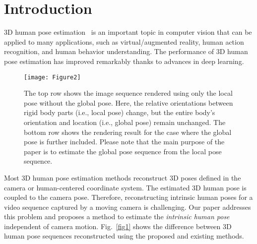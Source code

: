 \documentclass[10pt,twocolumn,letterpaper]{article}
\begin{document}
\section{Introduction}

3D human pose estimation~\cite{huang2017towards,pavlakos2017coarse,martinez2017simple,pavllo20193d,kanazawa2018end,kolotouros2019learning,kocabas2019self,guler2019holopose,kolotouros2019convolutional,Moon_2020_ECCV_I2L-MeshNet,kocabas2020vibe} is an important topic in computer vision that can be applied to many applications, such as virtual/augmented reality, human action recognition, and human behavior understanding. The performance of 3D human pose estimation has improved remarkably thanks to advances in deep learning.


\begin{figure*}[t]
\texttt{[image: Figure2]}
\vspace*{-6mm}
\caption{The top row shows the image sequence rendered using only the local pose without the global pose. Here, the relative orientations between rigid body parts (i.e., local pose) change, but the entire body's orientation and location (i.e., global pose) remain unchanged. The bottom row shows the rendering result for the case where the global pose is further included. Please note that the main purpose of the paper is to estimate the global pose sequence from the local pose sequence.}
\label{fig2}
\vspace*{-1mm}
\end{figure*}


Most 3D human pose estimation methods reconstruct 3D poses defined in the camera or human-centered coordinate system. The estimated 3D human pose is coupled to the camera pose. Therefore, reconstructing intrinsic human poses for a video sequence captured by a moving camera is challenging. Our paper addresses this problem and proposes a method to estimate the \emph{intrinsic human pose} independent of camera motion. Fig.~\ref{fig1} shows the difference between 3D human pose sequences reconstructed using the proposed and existing methods. 
\end{document}
